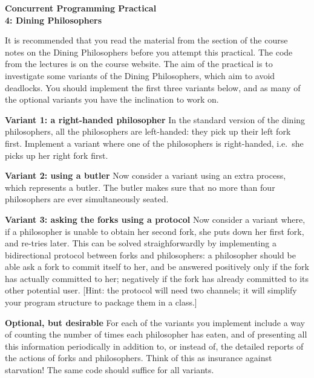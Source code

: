 \documentclass{../csopractical}
\def\Var#1{\textbf{#1}\newline}
\begin{document}
\begin{center}
\Large\bf Concurrent Programming Practical 
\\
4: Dining Philosophers
\end{center}

It is recommended that you read the material from the section of the
course notes on the Dining Philosophers before you attempt this practical.  The
code from the lectures is on the course website.
The aim of the practical is to investigate some variants of the Dining
Philosophers, which aim to avoid deadlocks.  You should implement the
first three variants below, and as many of the optional variants you
have the inclination to work on. 


\Var{Variant 1: a right-handed philosopher}
In the standard version of the dining philosophers, all the philosophers are
left-handed: they pick up their left fork first.  Implement a variant where
one of the philosophers is right-handed, i.e.\ she picks up her right fork
first. 


\Var{Variant 2: using a butler}
Now consider a variant using an extra process, which represents a butler.  The
butler makes sure that no more than four philosophers are ever simultaneously
seated. 


\Var{Variant 3: asking the forks using a protocol}
Now consider a variant where, if a philosopher is unable to obtain her second
fork, she puts down her first fork, and re-tries later.  
This can be solved straighforwardly by implementing a bidirectional
protocol between forks and philosophers: a philosopher should be able ask
a fork to commit itself to her, and be answered positively only if the fork has actually 
committed to her; negatively if the fork has already committed to its other 
potential user. [Hint: the protocol will need two channels; it will simplify
your program structure to package them in a class.]

\Var{Optional, but desirable} For each of the variants you implement include a way of
counting the number of times each philosopher has eaten, and of presenting all this
information periodically in addition to, or instead of, the detailed reports
of the actions of forks and philosophers. Think of this as insurance against 
starvation! The same code should suffice for all variants.
\end{document}
